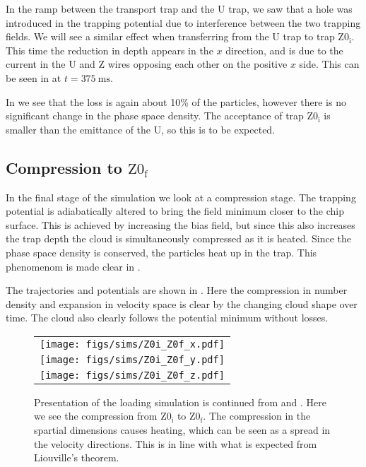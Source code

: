 In the ramp between the transport trap and the U trap, we saw that a hole was
introduced in the trapping potential due to interference between the two
trapping fields. We will see a similar effect when transferring from the U trap
to trap $\mathrm{Z0_i}$.  This time the reduction in depth appears in the $x$
direction, and is due to the current in the U and Z wires opposing each other
on the positive $x$ side. This can be seen in  at
$t=\SI{375}{\milli\second}$.

In  we see that the loss is again about 10\% of
the particles, however there is no significant change in the phase space
density. The acceptance of trap $\mathrm{Z0_i}$ is smaller than the emittance
of the U, so this is to be expected.

\subsection{Compression to $\mathrm{Z0_f}$}

In the final stage of the simulation we look at a compression stage. The
trapping potential is adiabatically altered to bring the field minimum closer
to the chip surface. This is achieved by increasing the bias field, but since
this also increases the trap depth the cloud is simultaneously compressed as it
is heated. Since the phase space density is conserved, the particles heat up in
the trap. This phenomenom is made clear in .

The trajectories and potentials are shown in .
Here the compression in number density and expansion in velocity space is clear
by the changing cloud shape over time. The cloud also clearly follows the
potential minimum without losses.

\begin{figure}[p]
\centering
  \begin{tabular}{c}
    \texttt{[image: figs/sims/Z0i\_Z0f\_x.pdf]} \\
    \texttt{[image: figs/sims/Z0i\_Z0f\_y.pdf]} \\
    \texttt{[image: figs/sims/Z0i\_Z0f\_z.pdf]}
  \end{tabular}
  \caption{Presentation of the loading simulation is continued from
   and . Here we see
  the compression from $\mathrm{Z0_i}$ to $\mathrm{Z0_f}$. The compression in
  the spartial dimensions causes heating, which can be seen as a spread in the
  velocity directions. This is in line with what is expected from Liouville's
  theorem.
  }
  \label{design:fig:Z0i_Z0f}
\end{figure}

